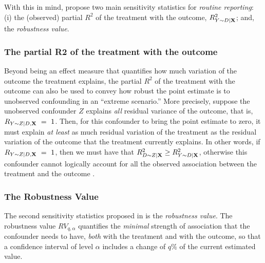 \documentclass[
]{jss}
\begin{document}
With this in mind, \citet{cinelli:jrssb2019} propose two main
sensitivity statistics for \emph{routine reporting}: (i) the (observed)
partial \(R^2\) of the treatment with the outcome,
\(R^2_{Y\sim D \mid {\bf X}}\); and, the \emph{robustness value}.

\hypertarget{the-partial-r2-of-the-treatment-with-the-outcome}{%
\subsubsection{The partial R2 of the treatment with the
outcome}\label{the-partial-r2-of-the-treatment-with-the-outcome}}

Beyond being an effect measure that quantifies how much variation of the
outcome the treatment explains, the partial \(R^2\) of the treatment
with the outcome can also be used to convey how robust the point
estimate is to unobserved confounding in an ``extreme scenario.'' More
precisely, suppose the unobserved confounder \(Z\) explains \emph{all}
residual variance of the outcome, that is,
\(R_{Y\sim Z|D, {\bf X}}~=~1\). Then, for this confounder to bring the
point estimate to zero, it must explain \emph{at least} as much residual
variation of the treatment as the residual variation of the outcome that
the treatment currently explains. In other words, if
\(R_{Y\sim Z|D, {\bf X}}~=~1\), then we must have that
\(R^2_{D\sim Z|{\bf X}} \geq R^2_{Y\sim D|{\bf X}}\), otherwise this
confounder cannot logically account for all the observed association
between the treatment and the outcome \citep{cinelli:jrssb2019}.

\hypertarget{the-robustness-value}{%
\subsubsection{The Robustness Value}\label{the-robustness-value}}

The second sensitivity statistics proposed in \citet{cinelli:jrssb2019}
is the \emph{robustness value}. The robustness value \(RV_{q,\alpha}\)
quantifies the \emph{minimal} strength of association that the
confounder needs to have, \emph{both} with the treatment and with the
outcome, so that a confidence interval of level \(\alpha\) includes a
change of \(q\%\) of the current estimated value.
\end{document}
